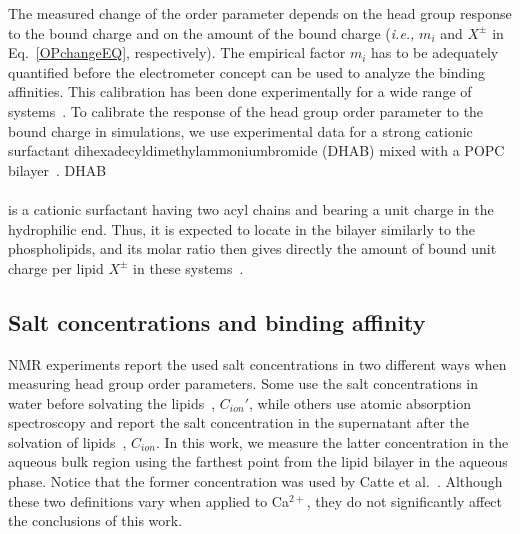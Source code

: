 \documentclass[aip,jcp,twocolumn]{revtex4}
\begin{document}
The measured change of the order parameter depends on the head group response to the bound charge and on the amount of the bound charge (\textit{i.e.,} $m_i$ and $X^\pm$ in Eq.~\ref{OPchangeEQ}, respectively).  The empirical factor $m_i$ has to be adequately quantified before the electrometer concept can be used to analyze the binding affinities. This calibration has been done experimentally for a wide range of systems~\cite{seelig87, beschiasvili91}. To calibrate the response of the head group order parameter to the bound charge in simulations, we use experimental data for a strong cationic surfactant dihexadecyldimethylammoniumbromide  (DHAB) mixed with a POPC bilayer~\cite{scherer89}. DHAB\\[0.5cm]
\vspace{0.5cm} \\
is a cationic surfactant having two acyl chains and bearing a unit charge in the hydrophilic end. Thus, it is expected to locate in the bilayer similarly to the phospholipids, and its molar ratio then gives directly the amount of bound unit charge per lipid $X^\pm$ in these systems~\cite{scherer89}.

\subsection{Salt concentrations and binding affinity}
NMR experiments report the used salt concentrations in two different ways when measuring head group order parameters.
Some use the salt concentrations in water before solvating the lipids~\cite{akutsu81}, $C_{ion}'$,
while others use atomic absorption spectroscopy and report the salt concentration in
the supernatant after the solvation of lipids~\cite{altenbach84}, $C_{ion}$. In this work,
we measure the latter concentration in the aqueous
bulk region using the farthest point from the lipid bilayer in the aqueous phase.
Notice that the former concentration was used by Catte et al.~\cite{catte16}.
Although these two definitions vary when applied
to Ca$^{2+}$, they do not significantly affect the conclusions of this work.
\end{document}
